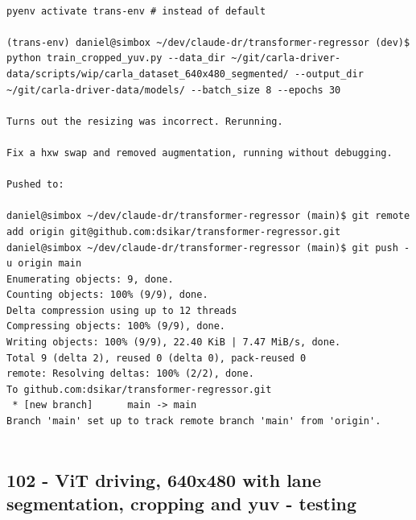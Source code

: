 \begin{verbatim}

pyenv activate trans-env # instead of default 

(trans-env) daniel@simbox ~/dev/claude-dr/transformer-regressor (dev)$ python train_cropped_yuv.py --data_dir ~/git/carla-driver-data/scripts/wip/carla_dataset_640x480_segmented/ --output_dir ~/git/carla-driver-data/models/ --batch_size 8 --epochs 30

Turns out the resizing was incorrect. Rerunning.

Fix a hxw swap and removed augmentation, running without debugging.

Pushed to:

daniel@simbox ~/dev/claude-dr/transformer-regressor (main)$ git remote add origin git@github.com:dsikar/transformer-regressor.git
daniel@simbox ~/dev/claude-dr/transformer-regressor (main)$ git push -u origin main
Enumerating objects: 9, done.
Counting objects: 100% (9/9), done.
Delta compression using up to 12 threads
Compressing objects: 100% (9/9), done.
Writing objects: 100% (9/9), 22.40 KiB | 7.47 MiB/s, done.
Total 9 (delta 2), reused 0 (delta 0), pack-reused 0
remote: Resolving deltas: 100% (2/2), done.
To github.com:dsikar/transformer-regressor.git
 * [new branch]      main -> main
Branch 'main' set up to track remote branch 'main' from 'origin'.


\end{verbatim}

\subsection{102 - ViT driving, 640x480 with lane segmentation, cropping and yuv - testing}
\label{app_res:102}

